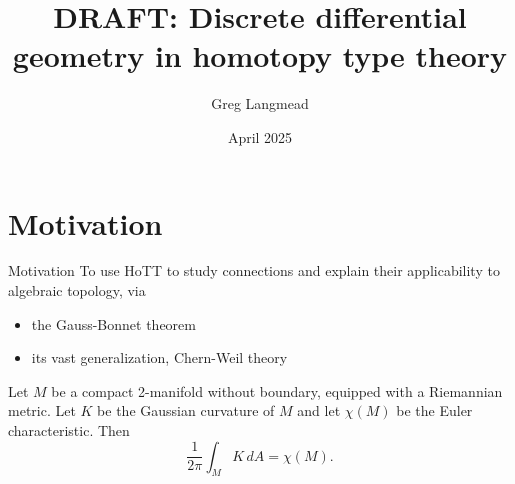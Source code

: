 \documentclass[14pt,aspectratio=169]{beamer}
\title[Geometry in HoTT]{DRAFT: Discrete differential geometry in homotopy type theory}
\author{Greg Langmead}
\institute[CMU]{Carnegie Mellon University}
\date{April 2025}
\begin{document}
\begin{frame}
\titlepage
\end{frame}


\section{Motivation}

\begin{frame}{Motivation}
To use HoTT to study \alert{connections} and \alert{explain} their applicability to algebraic topology, via
\begin{itemize}
\item the Gauss-Bonnet theorem
\item its vast generalization, Chern-Weil theory
\end{itemize}
\end{frame}

\begin{frame}
\begin{theorem}
Let \( M \) be a compact 2-manifold without boundary, equipped with a Riemannian metric. Let \( K \) be the Gaussian curvature of \( M \) and let \( \chi(M) \) be the Euler characteristic. Then \[\frac{1}{2\pi}\int_M K\,dA=\chi(M).\]
\end{theorem}
\end{frame}
\end{document}
